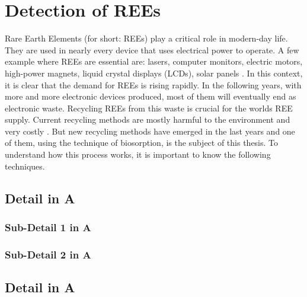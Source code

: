 
\chapter{Detection of REEs\authorB{}}

Rare Earth Elements (for short: REEs) play a critical role in modern-day life. They are used in nearly every device that uses electrical power to operate. A few example where REEs are essential are: lasers, computer monitors, electric motors, high-power magnets, liquid crystal displays (LCDs), solar panels \cite{usageofrees}.
In this context, it is clear that the demand for REEs is rising rapidly. In the following years, with more and more electronic devices produced, most of them will eventually end as electronic waste. Recycling REEs from this waste is crucial for the worlds REE supply. Current recycling methods are mostly harmful to the environment and very costly \cite{recyclingcurrent}. But new recycling methods have emerged in the last years and one of them, using the technique of biosorption, is the subject of this thesis. To understand how this process works, it is important to know the following techniques.

\section{Detail in A}

\subsection{Sub-Detail 1 in A}

\subsection{Sub-Detail 2 in A}

\section{Detail in A}
